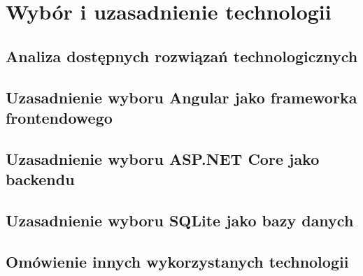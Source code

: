 %


\chapter{Wybór i uzasadnienie technologii}
\label{rozdzial2}

\section{Analiza dostępnych rozwiązań technologicznych}

\section{Uzasadnienie wyboru Angular jako frameworka frontendowego}

\section{Uzasadnienie wyboru ASP.NET Core jako backendu}

\section{Uzasadnienie wyboru SQLite jako bazy danych}

\section{Omówienie innych wykorzystanych technologii}



